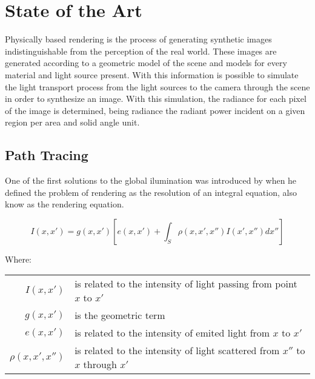 \chapter{State of the Art}

Physically based rendering is the process of generating synthetic images indistinguishable from the perception of the real world. These images are generated according to a geometric model of the scene and models for every material and light source present. With this information is possible to simulate the light transport process from the light sources to the camera through the scene in order to synthesize an image. With this simulation, the radiance for each pixel of the image is determined, being radiance the radiant power incident on a given region per area and solid angle unit.

\section{Path Tracing}

One of the first solutions to the global ilumination was introduced by \cite{Kajiya} when he defined the problem of rendering as the resolution of an integral equation, also know as the rendering equation.

\begin{equation}
I(x,x')=g(x,x')\left[e(x,x')+\int_{S}^{} \rho(x,x',x'')I(x',x'')dx''\right]
\label{eq:render_eq}
\end{equation}

Where:

\begin{tabular}{r l}
$I(x,x')$ & is related to the intensity of light passing from point $x$ to $x'$ \\
$g(x,x')$ & is the geometric term \\
$e(x,x')$ & is related to the intensity of emited light from $x$ to $x'$ \\
$\rho(x,x',x'')$ & is related to the intensity of light scattered from $x''$ to $x$ through $x'$\\
\end{tabular}
\\

